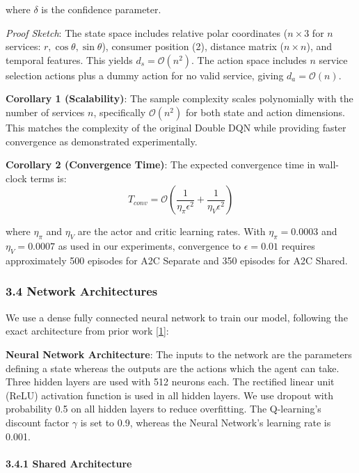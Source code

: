where \(\delta\) is the confidence parameter.

\emph{Proof Sketch}: The state space includes relative polar
coordinates (\(n \times 3\) for \(n\) services: \(r, \cos\theta,
\sin\theta\)), consumer position (2), distance matrix (\(n \times n\)),
and temporal features. This yields \(d_s = \mathcal{O}(n^2)\). The
action space includes \(n\) service selection actions plus a dummy
action for no valid service, giving \(d_a = \mathcal{O}(n)\).

\textbf{Corollary 1 (Scalability)}: The sample complexity scales
polynomially with the number of services \(n\), specifically
\(\mathcal{O}(n^2)\) for both state and action dimensions. This matches
the complexity of the original Double DQN while providing faster
convergence as demonstrated experimentally.

\textbf{Corollary 2 (Convergence Time)}: The expected convergence time
in wall-clock terms is:
\[T_{conv} = \mathcal{O}\left(\frac{1}{\eta_\pi \epsilon^2} + \frac{1}{\eta_V \epsilon^2}\right)\]

where \(\eta_\pi\) and \(\eta_V\) are the actor and critic learning
rates. With \(\eta_\pi = 0.0003\) and \(\eta_V = 0.0007\) as used in our
experiments, convergence to \(\epsilon = 0.01\) requires approximately
500 episodes for A2C Separate and 350 episodes for A2C Shared.

\hypertarget{network-architectures}{%
	\subsubsection{3.4 Network Architectures}\label{network-architectures}}

We use a dense fully connected neural network to train our model, following the exact architecture from prior work \hyperlink{cite.neiat2021}{\hyperlink{cite.neiat2021}{[1]}}:

\textbf{Neural Network Architecture}: The inputs to the network are the parameters defining a state whereas the outputs are the actions which the agent can take. Three hidden layers are used with 512 neurons each. The rectified linear unit (ReLU) activation function is used in all hidden layers. We use dropout with probability 0.5 on all hidden layers to reduce overfitting. The Q-learning's discount factor $\gamma$ is set to 0.9, whereas the Neural Network's learning rate is 0.001.

\hypertarget{relative-polar-coordinate-representation}{%
	\paragraph{3.4.1 Shared Architecture}\label{shared-architecture}}

